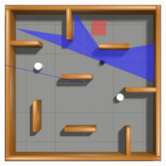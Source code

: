 \begin{figure}[H]
\begin{center}
\begin{subfigure}[b]{0.60\textwidth}
\begin{subfigure}[b]{0.24\textwidth}
        \end{subfigure}
        \hfill
        \begin{subfigure}[b]{0.24\textwidth}
            \includegraphics[width=\textwidth]{imagens/simulated_envs/sim_env3_ddpg/4.png}
        \end{subfigure}
        

\end{subfigure}
\end{center}
\end{figure}
